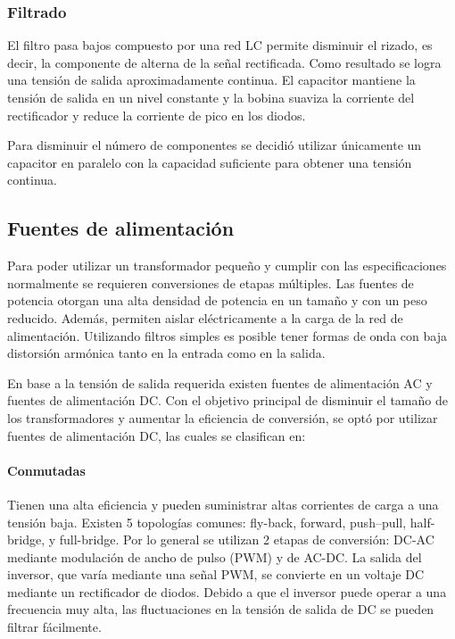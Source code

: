 
\subsubsection{Filtrado}
El filtro pasa bajos compuesto por una red LC permite disminuir el rizado,
es decir, la componente de alterna de la señal rectificada. 
Como resultado se logra una tensión de salida aproximadamente continua.
El capacitor mantiene la tensión de salida en un nivel constante y
la bobina suaviza la corriente del rectificador y reduce la corriente de pico en los diodos. 

Para disminuir el número de componentes se decidió utilizar únicamente
un capacitor en paralelo con la capacidad suficiente para obtener una tensión continua.

\subsection{Fuentes de alimentación}

Para poder utilizar un transformador pequeño y cumplir con las especificaciones normalmente se requieren conversiones de etapas múltiples.
Las fuentes de potencia otorgan una alta densidad de potencia en un tamaño y con un peso reducido.  
Además, permiten aislar eléctricamente a la carga de la red de alimentación. 
Utilizando filtros simples es posible tener formas de onda con baja distorsión armónica tanto en la entrada como en la salida. 

En base a la tensión de salida requerida existen fuentes de alimentación AC y fuentes de alimentación DC.
Con el objetivo principal de disminuir el tamaño de los transformadores y aumentar la eficiencia de conversión, se optó por utilizar fuentes de alimentación DC,
las cuales se clasifican en:

\paragraph{Conmutadas}
Tienen una alta eficiencia y pueden suministrar altas corrientes de carga a una tensión baja.
Existen 5 topologías comunes: fly-back, forward, push–pull, half-bridge, y full-bridge.
Por lo general se utilizan 2 etapas de conversión: DC-AC mediante modulación de ancho de pulso (PWM) y de AC-DC.
La salida del inversor, que varía mediante una señal PWM, se convierte en un voltaje DC mediante un rectificador de diodos. 
Debido a que el inversor puede operar a una frecuencia muy alta, las fluctuaciones en la tensión de salida de DC se pueden filtrar fácilmente.

